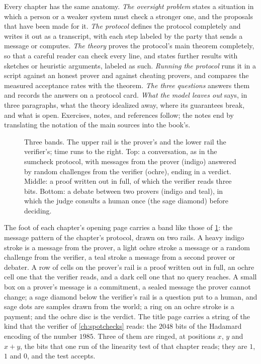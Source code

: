 \begin{refsection}
Every chapter has the same anatomy. \emph{The oversight problem} states a situation in which a person or a weaker system must check a stronger one, and the proposals that have been made for it. \emph{The protocol} defines the protocol completely and writes it out as a transcript, with each step labeled by the party that sends a message or computes. \emph{The theory} proves the protocol's main theorem completely, so that a careful reader can check every line, and states further results with sketches or heuristic arguments, labeled as such. \emph{Running the protocol} runs it in a script against an honest prover and against cheating provers, and compares the measured acceptance rates with the theorem. \emph{The three questions} answers them and records the answers on a protocol card. \emph{What the model leaves out} says, in three paragraphs, what the theory idealized away, where its guarantees break, and what is open. Exercises, notes, and references follow; the notes end by translating the notation of the main sources into the book's.

\begin{figure}[t]
\begin{fullwidth}

\vspace{1mm}

\vspace{1mm}
\end{fullwidth}
\caption{Three bands. The upper rail is the prover's and the lower rail the verifier's; time runs to the right. Top: a conversation, as in the sumcheck protocol, with messages from the prover (indigo) answered by random challenges from the verifier (ochre), ending in a verdict. Middle: a proof written out in full, of which the verifier reads three bits. Bottom: a debate between two provers (indigo and teal), in which the judge consults a human once (the sage diamond) before deciding.}\label{fig:prologue:bands}
\end{figure}

The foot of each chapter's opening page carries a band like those of \cref{fig:prologue:bands}: the message pattern of the chapter's protocol, drawn on two rails. A heavy indigo stroke is a message from the prover, a light ochre stroke a message or a random challenge from the verifier, a teal stroke a message from a second prover or debater. A row of cells on the prover's rail is a proof written out in full, an ochre cell one that the verifier reads, and a dark cell one that no query reaches. A small box on a prover's message is a commitment, a sealed message the prover cannot change; a sage diamond below the verifier's rail is a question put to a human, and sage dots are samples drawn from the world; a ring on an ochre stroke is a payment; and the ochre disc is the verdict. The title page carries a string of the kind that the verifier of \cref{ch:spotchecks} reads: the $2048$ bits of the Hadamard encoding of the number $1985$. Three of them are ringed, at positions $x$, $y$ and $x+y$, the bits that one run of the linearity test of that chapter reads; they are $1$, $1$ and $0$, and the test accepts.


\end{refsection}
